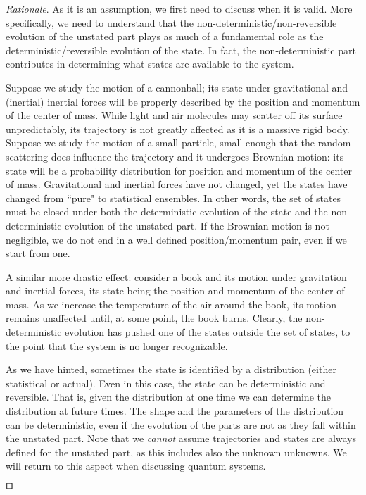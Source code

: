 \documentclass[smallextended]{svjour3}
\numberwithin{equation}{section}
\newenvironment{rationale}{\emph{Rationale}.}{\hfill\(\qed\)}
\begin{document}
\begin{rationale}
As it is an assumption, we first need to discuss when it is valid. More specifically, we need to understand that the non-deterministic/non-reversible evolution of the unstated part plays as much of a fundamental role as the deterministic/reversible evolution of the state. In fact, the non-deterministic part contributes in determining what states are available to the system.

Suppose we study the motion of a cannonball; its state under gravitational and (inertial) inertial forces will be properly described by the position and momentum of the center of mass. While light and air molecules may scatter off its surface unpredictably, its trajectory is not greatly affected as it is a massive rigid body. Suppose we study the motion of a small particle, small enough that the random scattering does influence the trajectory and it undergoes Brownian motion: its state will be a probability distribution for position and momentum of the center of mass. Gravitational and inertial forces have not changed, yet the states have changed from ``pure" to statistical ensembles. In other words, the set of states must be closed under both the deterministic evolution of the state and the non-deterministic evolution of the unstated part. If the Brownian motion is not negligible, we do not end in a well defined position/momentum pair, even if we start from one.

A similar more drastic effect: consider a book and its motion under gravitation and inertial forces, its state being the position and momentum of the center of mass. As we increase the temperature of the air around the book, its motion remains unaffected until, at some point, the book burns. Clearly, the non-deterministic evolution has pushed one of the states outside the set of states, to the point that the system is no longer recognizable.

As we have hinted, sometimes the state is identified by a distribution (either statistical or actual). Even in this case, the state can be deterministic and reversible. That is, given the distribution at one time we can determine the distribution at future times. The shape and the parameters of the distribution can be deterministic, even if the evolution of the parts are not as they fall within the unstated part. Note that we \emph{cannot} assume trajectories and states are always defined for the unstated part, as this includes also the unknown unknowns. We will return to this aspect when discussing quantum systems.


\end{rationale}
\end{document}
